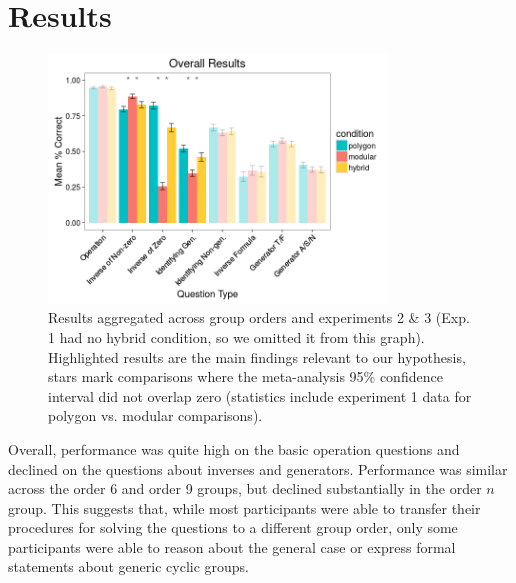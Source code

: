 \documentclass[man,10pt]{apa6}
\begin{document}
\section{Results}
\begin{figure}
\centering
\includegraphics[width=0.8\textwidth]{figures/overall_results.png}
\caption{Results aggregated across group orders and experiments 2 \& 3 (Exp. 1 had no hybrid condition, so we omitted it from this graph). Highlighted results are the main findings relevant to our hypothesis, stars mark comparisons where the meta-analysis 95\% confidence interval did not overlap zero (statistics include experiment 1 data for polygon vs. modular comparisons).}
\label{overall_results}
\end{figure}
Overall, performance was quite high on the basic operation questions and declined on the questions about inverses and generators. Performance was similar across the order 6 and order 9 groups, but declined substantially in the order $n$ group. This suggests that, while most participants were able to transfer their procedures for solving the questions to a different group order, only some participants were able to reason about the general case or express formal statements about generic cyclic groups.\par
\end{document}
